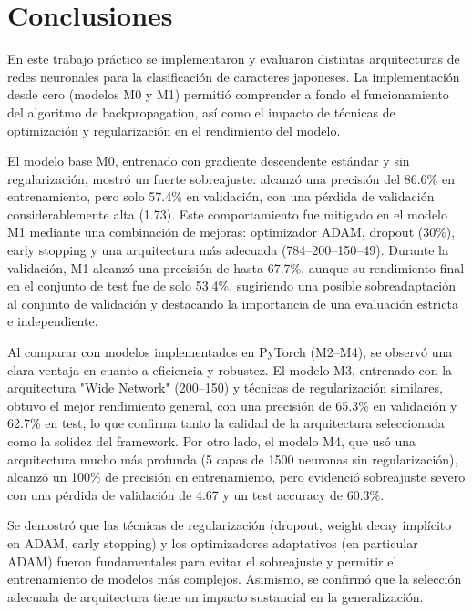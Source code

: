 \documentclass[11pt]{article}
\begin{document}
\section{Conclusiones}

En este trabajo práctico se implementaron y evaluaron distintas arquitecturas de redes neuronales para la clasificación de caracteres japoneses. La implementación desde cero (modelos M0 y M1) permitió comprender a fondo el funcionamiento del algoritmo de backpropagation, así como el impacto de técnicas de optimización y regularización en el rendimiento del modelo.

El modelo base M0, entrenado con gradiente descendente estándar y sin regularización, mostró un fuerte sobreajuste: alcanzó una precisión del 86.6\% en entrenamiento, pero solo 57.4\% en validación, con una pérdida de validación considerablemente alta (1.73). Este comportamiento fue mitigado en el modelo M1 mediante una combinación de mejoras: optimizador ADAM, dropout (30\%), early stopping y una arquitectura más adecuada (784–200–150–49). Durante la validación, M1 alcanzó una precisión de hasta 67.7\%, aunque su rendimiento final en el conjunto de test fue de solo 53.4\%, sugiriendo una posible sobreadaptación al conjunto de validación y destacando la importancia de una evaluación estricta e independiente.

Al comparar con modelos implementados en PyTorch (M2–M4), se observó una clara ventaja en cuanto a eficiencia y robustez. El modelo M3, entrenado con la arquitectura "Wide Network" (200–150) y técnicas de regularización similares, obtuvo el mejor rendimiento general, con una precisión de 65.3\% en validación y 62.7\% en test, lo que confirma tanto la calidad de la arquitectura seleccionada como la solidez del framework. Por otro lado, el modelo M4, que usó una arquitectura mucho más profunda (5 capas de 1500 neuronas sin regularización), alcanzó un 100\% de precisión en entrenamiento, pero evidenció sobreajuste severo con una pérdida de validación de 4.67 y un test accuracy de 60.3\%.

Se demostró que las técnicas de regularización (dropout, weight decay implícito en ADAM, early stopping) y los optimizadores adaptativos (en particular ADAM) fueron fundamentales para evitar el sobreajuste y permitir el entrenamiento de modelos más complejos. Asimismo, se confirmó que la selección adecuada de arquitectura tiene un impacto sustancial en la generalización.
\end{document}
